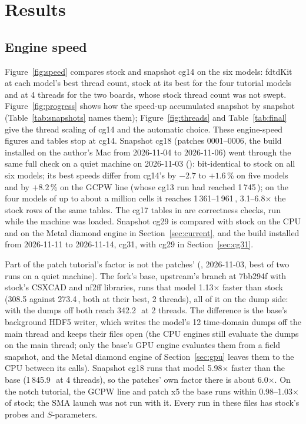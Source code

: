 \section{Results}\label{sec:results}

\subsection{Engine speed}
Figure~\ref{fig:speed} compares stock and snapshot cg14 on the six models: fdtdKit at each model's best thread count,
stock at its best for the four tutorial models and at 4 threads for the two boards, whose stock thread count was not
swept. Figure~\ref{fig:progress} shows how the speed-up accumulated snapshot by snapshot (Table~\ref{tab:snapshots}
names them); Figure~\ref{fig:threads} and Table~\ref{tab:final} give the thread scaling of cg14 and the automatic
choice. These engine-speed figures and tables stop at cg14. Snapshot cg18 (patches 0001--0006, the build installed on
the author's Mac from 2026-11-04 to 2026-11-06) went through the same full check on a quiet machine on 2026-11-03
():
bit-identical to stock on all six
models; its best speeds differ from cg14's by $-2.7$ to $+1.6$\,\% on five models and by $+8.2$\,\% on the GCPW line
(whose cg13 run had reached 1\,745\,\MC); on the four models of up to about a million cells it reaches
1\,361--1\,961\,\MC, 3.1--6.8$\times$ the stock rows of the same tables. The cg17 tables in  are
correctness checks, run while the machine was loaded. Snapshot cg29 is compared with stock on the CPU and
on the Metal diamond engine in Section~\ref{sec:current}, and the build installed from 2026-11-11 to 2026-11-14, cg31, with cg29 in
Section~\ref{sec:cg31}.

Part of the patch tutorial's factor is not the patches' (, 2026-11-03, best of two runs on
a quiet machine). The fork's base, upstream's  branch at 7bb294f with stock's CSXCAD and nf2ff
libraries, runs that model 1.13$\times$ faster than stock (308.5 against 273.4\,\MC, both at their best, 2 threads),
all of it on the dump side: with the dumps off both reach 342.2\,\MC\ at 2 threads. The difference is the base's
background HDF5 writer, which writes the model's 12 time-domain dumps off the main thread and keeps their files open
(the CPU engines still evaluate the dumps on the main thread; only the base's GPU engine evaluates them from a field
snapshot, and the Metal diamond engine of Section~\ref{sec:gpu} leaves them to the CPU between its calls). Snapshot
cg18 runs that model 5.98$\times$ faster than the base (1\,845.9\,\MC\ at 4 threads), so the
patches' own factor there is about 6.0$\times$. On the notch tutorial, the GCPW line and patch x5 the base runs within
0.98--1.03$\times$ of stock; the SMA launch was not run with it. Every run in these files has stock's probes and
$S$-parameters.

